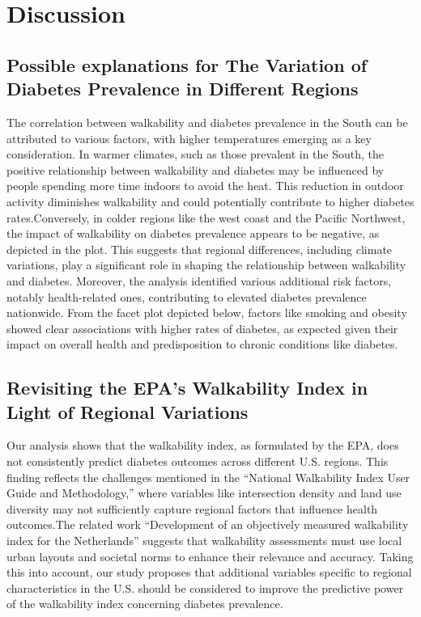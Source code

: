 \documentclass[
]{article}
\begin{document}
\section{Discussion}\label{discussion}

\subsection{Possible explanations for The Variation of Diabetes
Prevalence in Different
Regions}\label{possible-explanations-for-the-variation-of-diabetes-prevalence-in-different-regions}

The correlation between walkability and diabetes prevalence in the South
can be attributed to various factors, with higher temperatures emerging
as a key consideration. In warmer climates, such as those prevalent in
the South, the positive relationship between walkability and diabetes
may be influenced by people spending more time indoors to avoid the
heat. This reduction in outdoor activity diminishes walkability and
could potentially contribute to higher diabetes rates.Conversely, in
colder regions like the west coast and the Pacific Northwest, the impact
of walkability on diabetes prevalence appears to be negative, as
depicted in the plot. This suggests that regional differences, including
climate variations, play a significant role in shaping the relationship
between walkability and diabetes. Moreover, the analysis identified
various additional risk factors, notably health-related ones,
contributing to elevated diabetes prevalence nationwide. From the facet
plot depicted below, factors like smoking and obesity showed clear
associations with higher rates of diabetes, as expected given their
impact on overall health and predisposition to chronic conditions like
diabetes.

\subsection{Revisiting the EPA's Walkability Index in Light of Regional
Variations}\label{revisiting-the-epas-walkability-index-in-light-of-regional-variations}

Our analysis shows that the walkability index, as formulated by the EPA,
does not consistently predict diabetes outcomes across different U.S.
regions. This finding reflects the challenges mentioned in the
``National Walkability Index User Guide and Methodology,'' where
variables like intersection density and land use diversity may not
sufficiently capture regional factors that influence health outcomes.The
related work ``Development of an objectively measured walkability index
for the Netherlands'' suggests that walkability assessments must use
local urban layouts and societal norms to enhance their relevance and
accuracy. Taking this into account, our study proposes that additional
variables specific to regional characteristics in the U.S. should be
considered to improve the predictive power of the walkability index
concerning diabetes prevalence.
\end{document}
